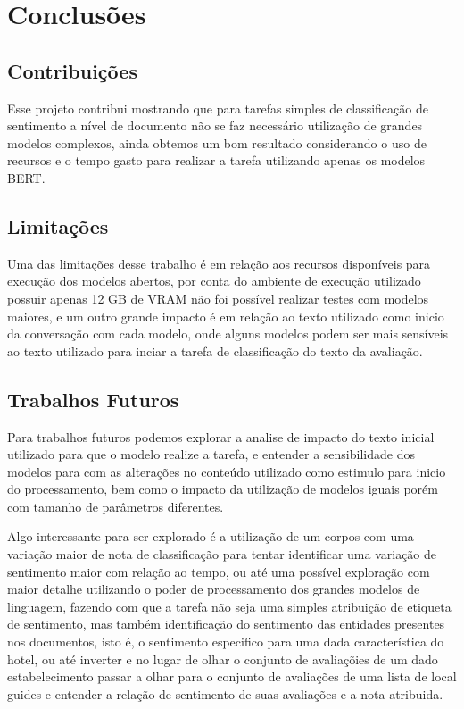 \chapter{Conclusões}
\label{cap:conclusao}
\section{Contribuições}

Esse projeto contribui mostrando que para tarefas simples de classificação de sentimento a nível de documento não se faz necessário utilização de grandes modelos complexos, ainda obtemos um bom resultado considerando o uso de recursos e o tempo gasto para realizar a tarefa utilizando apenas os modelos BERT.

\section{Limitações}

Uma das limitações desse trabalho é em relação aos recursos disponíveis para execução dos modelos abertos, por conta do ambiente de execução utilizado possuir apenas 12 GB de VRAM não foi possível realizar testes com modelos maiores, e um outro grande impacto é em relação ao texto utilizado como inicio da conversação com cada modelo, onde alguns modelos podem ser mais sensíveis ao texto utilizado para inciar a tarefa de classificação do texto da avaliação.


\section{Trabalhos Futuros}

Para trabalhos futuros podemos explorar a analise de impacto do texto inicial utilizado para que o modelo realize a tarefa, e entender a sensibilidade dos modelos para com as alterações no conteúdo utilizado como estimulo para inicio do processamento, bem como o impacto da utilização de modelos iguais porém com tamanho de parâmetros diferentes.

Algo interessante para ser explorado é a utilização de um corpos com uma variação maior de nota de classificação para tentar identificar uma variação de sentimento maior com relação ao tempo, ou até uma possível exploração com maior detalhe utilizando o poder de processamento dos grandes modelos de linguagem, fazendo com que a tarefa não seja uma simples atribuição de etiqueta de sentimento, mas também identificação do sentimento das entidades presentes nos documentos, isto é, o sentimento especifico para uma dada característica do hotel, ou até inverter e no lugar de olhar o conjunto de avaliaçõies de um dado estabelecimento passar a olhar para o conjunto de avaliações de uma lista de local guides e entender a relação de sentimento de suas avaliações e a nota atribuida.
